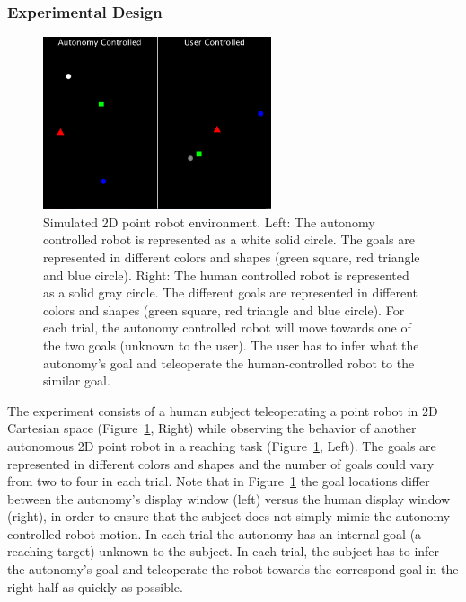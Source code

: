 \documentclass[12pt]{article}
\begin{document}
\subsubsection{Experimental Design}
\begin{figure}[t!]
	\includegraphics[keepaspectratio, width = 0.6\textwidth, center]{./figures/TransPic.png}
	\caption{Simulated 2D point robot environment. Left: The autonomy controlled robot is represented as a white solid circle. The goals are represented in different colors and shapes (green square, red triangle and blue circle). Right: The human controlled robot is represented as a solid gray circle. The different goals are represented in different colors and shapes (green square, red triangle and blue circle). For each trial, the autonomy controlled robot will move towards one of the two goals (unknown to the user). The user has to infer what the autonomy's goal and teleoperate the human-controlled robot to the similar goal. }
	\label{fig:2d_exp}
\end{figure}
The experiment consists of a human subject teleoperating a point robot in 2D Cartesian space (Figure~\ref{fig:2d_exp}, Right) while observing the behavior of another autonomous 2D point robot in a reaching task (Figure~\ref{fig:2d_exp}, Left). The goals are represented in different colors and shapes and the number of goals could vary from two to four in each trial. Note that in Figure~\ref{fig:2d_exp} the goal locations differ between the autonomy's display window (left) versus the human display window (right), in order to ensure that the subject does not simply mimic the autonomy controlled robot motion. 
In each trial the autonomy has an internal goal (a reaching target) unknown to the subject. In each trial, the subject has to infer the autonomy's goal and teleoperate the robot towards the correspond goal in the right half as quickly as possible. 
\end{document}
